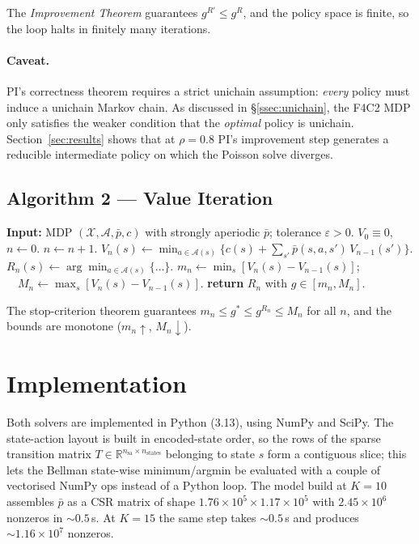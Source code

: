 \documentclass[11pt,a4paper]{article}
\newcommand{\R}{\mathbb{R}}
\newcommand{\X}{\mathcal{X}}
\newcommand{\A}{\mathcal{A}}
\begin{document}
The \emph{Improvement Theorem} guarantees $g^{R'} \le g^R$, and the
policy space is finite, so the loop halts in finitely many iterations.

\paragraph{Caveat.}
PI's correctness theorem requires a strict unichain assumption:
\emph{every} policy must induce a unichain Markov chain. As discussed
in \S\ref{ssec:unichain}, the F4C2 MDP only satisfies the weaker
condition that the \emph{optimal} policy is unichain.
Section~\ref{sec:results} shows that at $\rho = 0.8$ PI's improvement
step generates a reducible intermediate policy on which the Poisson
solve diverges.

\subsection{Algorithm 2 --- Value Iteration}

\begin{algorithm}[h]
\caption{Value Iteration (average cost)}
\label{alg:vi}
\begin{algorithmic}[1]
\State \textbf{Input:} MDP $(\X, \A, \bar{p}, c)$ with strongly
  aperiodic $\bar{p}$; tolerance $\varepsilon > 0$.
\State $V_0 \equiv 0$, $n \leftarrow 0$.
\Repeat
  \State $n \leftarrow n + 1$.
  \For{each $s \in \X$}
    \State $V_n(s) \leftarrow \min_{a \in \A(s)}
      \Big\{c(s) + \sum_{s'} \bar{p}(s, a, s') \, V_{n - 1}(s')\Big\}$.
    \State $R_n(s) \leftarrow \arg\min_{a \in \A(s)} \{\dots\}$.
  \EndFor
  \State $m_n \leftarrow \min_s [V_n(s) - V_{n - 1}(s)]$;
        $\quad M_n \leftarrow \max_s [V_n(s) - V_{n - 1}(s)]$.
\State \textbf{return} $R_n$ with $g \in [m_n, M_n]$.
\end{algorithmic}
\end{algorithm}

The stop-criterion theorem guarantees
$m_n \le g^* \le g^{R_n} \le M_n$ for all $n$, and the bounds are
monotone ($m_n \uparrow$, $M_n \downarrow$).

\section{Implementation}
\label{sec:impl}

Both solvers are implemented in Python (3.13), using NumPy and
SciPy. The state-action layout is built in encoded-state order, so
the rows of the sparse transition matrix
$T \in \R^{n_{\mathrm{sa}} \times n_{\mathrm{states}}}$ belonging to
state $s$ form a contiguous slice; this lets the Bellman state-wise
minimum/argmin be evaluated with a couple of vectorised NumPy ops
instead of a Python loop. The model build at $K = 10$ assembles
$\bar{p}$ as a CSR matrix of shape
$1.76 \times 10^5 \times 1.17 \times 10^5$ with $2.45 \times 10^6$
nonzeros in $\sim 0.5$\,s. At $K = 15$ the same step takes $\sim 0.5$\,s
and produces $\sim 1.16 \times 10^7$ nonzeros.
\end{document}
